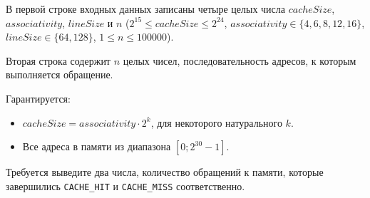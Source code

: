 В первой строке входных данных записаны четыре целых числа
$cacheSize$, $associativity$, $lineSize$ и $n$ ($2^{15} \le cacheSize \le 2^{24}$,
$associativity \in \{4,6,8,12,16\}$, $lineSize \in \{64, 128\}$, $1 \le n \le 100000$).

Вторая строка содержит $n$ целых чисел, последовательность адресов, к которым выполняется обращение.

Гарантируется:
\begin{itemize}
\item $cacheSize = associativity  \cdot 2^{k}$, для некоторого натурального $k$.
\item Все адреса в памяти из диапазона $[0; 2^{30} - 1]$.
\end{itemize}

Требуется выведите два числа, количество обращений к памяти, которые завершились \texttt{CACHE\_HIT} и
\texttt{CACHE\_MISS} соответственно.
